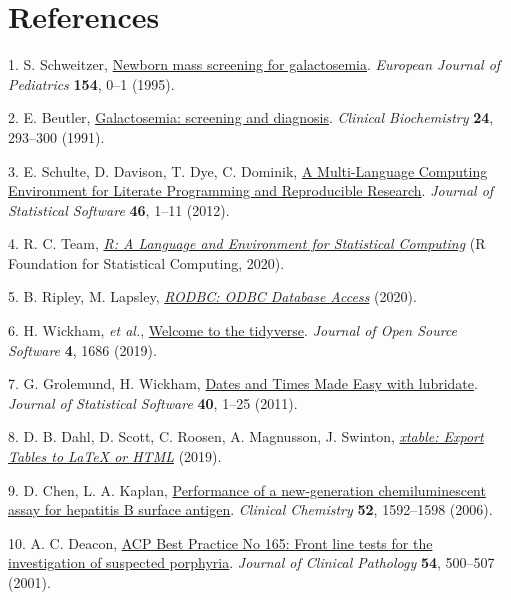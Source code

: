 \documentclass[review]{elsarticle}
\begin{document}
\section*{References}
\label{sec:org0607399}
\hypertarget{citeproc_bib_item_1}{1.  S. Schweitzer, \href{https://doi.org/10.1007/BF02143801}{Newborn mass screening for galactosemia}. \textit{European Journal of Pediatrics} \textbf{154}, 0–1 (1995).}

\hypertarget{citeproc_bib_item_2}{2.  E. Beutler, \href{https://doi.org/10.1016/0009-9120(91)80003-L}{Galactosemia: screening and diagnosis}. \textit{Clinical Biochemistry} \textbf{24}, 293–300 (1991).}

\hypertarget{citeproc_bib_item_3}{3.  E. Schulte, D. Davison, T. Dye, C. Dominik, \href{https://doi.org/10.18637/jss.v046.i03}{A Multi-Language Computing Environment for Literate Programming and Reproducible Research}. \textit{Journal of Statistical Software} \textbf{46}, 1–11 (2012).}

\hypertarget{citeproc_bib_item_4}{4.  R. C. Team, \textit{\href{https://www.R-project.org/}{R: A Language and Environment for Statistical Computing}} (R Foundation for Statistical Computing, 2020).}

\hypertarget{citeproc_bib_item_5}{5.  B. Ripley, M. Lapsley, \textit{\href{https://CRAN.R-project.org/package=RODBC}{RODBC: ODBC Database Access}} (2020).}

\hypertarget{citeproc_bib_item_6}{6.  H. Wickham, \textit{et al.}, \href{https://doi.org/10.21105/joss.01686}{Welcome to the tidyverse}. \textit{Journal of Open Source Software} \textbf{4}, 1686 (2019).}

\hypertarget{citeproc_bib_item_7}{7.  G. Grolemund, H. Wickham, \href{https://www.jstatsoft.org/v40/i03/}{Dates and Times Made Easy with lubridate}. \textit{Journal of Statistical Software} \textbf{40}, 1–25 (2011).}

\hypertarget{citeproc_bib_item_8}{8.  D. B. Dahl, D. Scott, C. Roosen, A. Magnusson, J. Swinton, \textit{\href{https://CRAN.R-project.org/package=xtable}{xtable: Export Tables to LaTeX or HTML}} (2019).}

\hypertarget{citeproc_bib_item_9}{9.  D. Chen, L. A. Kaplan, \href{https://doi.org/10.1373/clinchem.2005.064063}{Performance of a new-generation chemiluminescent assay for hepatitis B surface antigen}. \textit{Clinical Chemistry} \textbf{52}, 1592–1598 (2006).}

\hypertarget{citeproc_bib_item_10}{10.  A. C. Deacon, \href{https://doi.org/10.1136/jcp.54.7.500}{ACP Best Practice No 165: Front line tests for the investigation of suspected porphyria}. \textit{Journal of Clinical Pathology} \textbf{54}, 500–507 (2001).}
\end{document}

